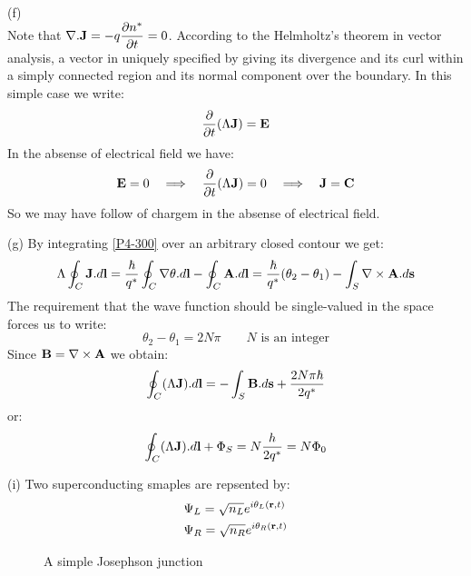 \begin{homeworkProblem}
\begin{homeworkSection}{(f)}
\begin{equation}
\end{equation}
Note that $\nabla.\mathbf{J}=-q\dfrac{\partial n^*}{\partial t}=0$. According to the Helmholtz's theorem in vector analysis, a vector in uniquely specified by giving its divergence and its curl within a simply connected region  and its normal component over the boundary. In this simple case we write:
\begin{equation}
\frac{\partial}{\partial t}(\Lambda\mathbf{J})=\mathbf{E}
\end{equation}
In the absense of electrical field we have:
\begin{equation}
\mathbf{E}=0\quad\Longrightarrow\quad \frac{\partial}{\partial t}(\Lambda\mathbf{J})=0\quad\Longrightarrow\quad \mathbf{J}=\mathbf{C}
\end{equation}
So we may have follow of chargem in the absense of electrical field.

\end{homeworkSection}
\begin{homeworkSection}{(g)}
By integrating \eqref{P4-300} over an arbitrary closed contour we get:
\begin{equation}
\Lambda\oint_C\mathbf{J}.d\mathbf{l}=\frac{\hbar}{q^*}\oint_C\nabla\theta .d\mathbf{l}-\oint_C\mathbf{A}.d\mathbf{l}=\frac{\hbar}{q^*}(\theta_2-\theta_1)-\int_S\nabla\times\mathbf{A}.d\mathbf{s}
\end{equation} 
The requirement that the wave function should be single-valued in the space forces us to write:
\begin{equation}
\theta_2-\theta_1=2N\pi \qquad \text{$N$ is an integer} 
\end{equation}
Since $\mathbf{B}=\nabla\times\mathbf{A}$ we obtain:
\begin{equation}
\oint_C(\Lambda\mathbf{J}).d\mathbf{l}=-\int_S\mathbf{B}.d\mathbf{s}+\frac{2N\pi\hbar}{2q^*}
\end{equation}
or:
\begin{equation}
\oint_C(\Lambda\mathbf{J}).d\mathbf{l}+\Phi_S=N\frac{h}{2q^*}=N\Phi_0
\end{equation}
\end{homeworkSection}
\begin{homeworkSection}{(i)}
Two superconducting smaples are repsented by:
\begin{align*}
&\Psi_L=\sqrt{n_L}e^{i\theta_L(\mathbf{r},t)}\\
&\Psi_R=\sqrt{n_R}e^{i\theta_R(\mathbf{r},t)}
\end{align*}
\begin{figure}[!h]
\centering

\caption{\small A simple Josephson junction}
\end{figure}


\end{homeworkSection}
\end{homeworkProblem}
